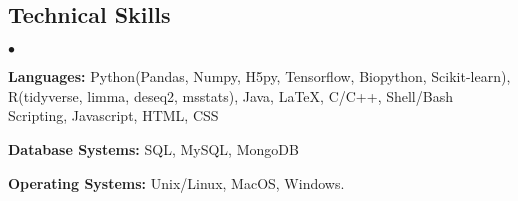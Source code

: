 \documentclass[margin,line]{res}
\newenvironment{list2}{
  \begin{list}{$\bullet$}{%
      \setlength{\itemsep}{0in}
      \setlength{\parsep}{0in} \setlength{\parskip}{0in}
      \setlength{\topsep}{0in} \setlength{\partopsep}{0in}
      \setlength{\leftmargin}{0.2in}}}{\end{list}}
\begin{document}
\begin{resume}
\section{\sc Technical Skills}
\begin{list2}
\item {\bf Languages:}  Python(Pandas, Numpy, H5py, Tensorflow, Biopython, Scikit-learn), R(tidyverse, limma, deseq2, msstats), Java, \LaTeX, C/C++, Shell/Bash Scripting, Javascript, HTML, CSS
\item {\bf Database Systems:} SQL, MySQL, MongoDB
\item {\bf Operating Systems:}  Unix/Linux, MacOS, Windows.
\end{list2}



\end{resume}
\end{document}
